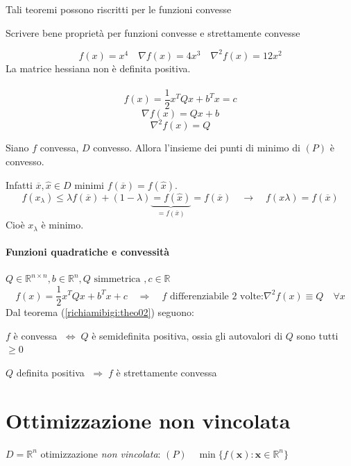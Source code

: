 \begin{notes}
 Tali teoremi possono riscritti per le funzioni convesse
\end{notes}

\begin{todo}
 Scrivere bene proprietà per funzioni convesse e strettamente convesse
\end{todo}
$$f(x) = x^4 \quad \nabla f(x) = 4x^{3} \quad \nabla^{2} f(x) = 12 x^{2} $$ 
La matrice hessiana non è definita positiva. \\ \\
$$f(x) = \frac{1}{2} x^{T} Q x + b^{T}x = c$$
$$ \nabla f(x) = Q x + b$$
$$ \nabla^2 f(x) = Q$$


\begin{proposition}
 Siano $f$ convessa, $D$ convesso. Allora l'insieme dei punti di minimo
 di $(P)$ è convesso.
\end{proposition}

Infatti  $\overline{x}, \hat{x} \in D$ minimi $f(\overline{x}) = f(\hat{x})$.
  $$ f(x_{\lambda}) \leq  \lambda f(\overline{x}) + 
  (1-\lambda) \underbrace{=f(\hat{x})}_{=f(\overline{x})} = f(\overline{x})
  \quad \rightarrow \quad  f(x\lambda) = f(\overline{x})$$
  Cioè $x_{\lambda}$ è minimo.

\paragraph{Funzioni quadratiche e convessit\`a}
 $Q \in \mathbb{R}^{n \times n} , b \in \mathbb{R}^{n},
 Q \text{ simmetrica }, c \in \mathbb{R}$
$$ f(x) = \dfrac{1}{2} x^{T}Qx + b^{T}x + c
\quad \Longrightarrow \quad f \text{ differenziabile 2 volte:}
\nabla^{2}f(x) \equiv Q \quad \forall x
$$
Dal teorema (\ref{richiamibigi:theo02}) seguono:
\begin{property}
$f$ \`e convessa $\; \Longleftrightarrow \; Q$ \`e semidefinita positiva,
ossia gli autovalori di $Q$ sono tutti $\geq 0$
\end{property}

\begin{property}\label{prop:quadratica-defpos-convessa}
$Q$ definita positiva $\; \Longrightarrow \; f$ \`e strettamente convessa
\end{property}



\section{Ottimizzazione non vincolata}
$D = \mathbb{R}^{n}$ otimizzazione \emph{non vincolata}: $(P) \quad \min\{f(\mathbf{x}): \mathbf{x} \in \mathbb{R}^{n}\}$

